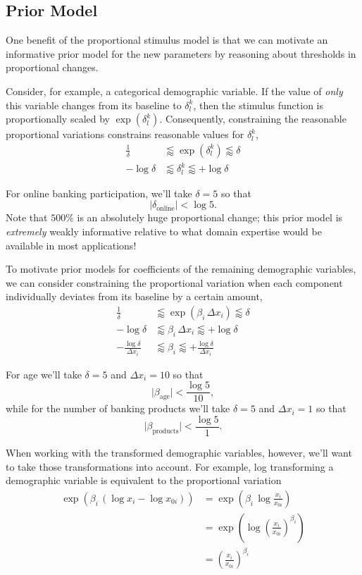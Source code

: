 \documentclass[
  letterpaper,
  DIV=11,
  numbers=noendperiod]{scrartcl}
\begin{document}
\subsection{Prior Model}\label{prior-model-2}

One benefit of the proportional stimulus model is that we can motivate
an informative prior model for the new parameters by reasoning about
thresholds in proportional changes.

Consider, for example, a categorical demographic variable. If the value
of \emph{only} this variable changes from its baseline to
\(\delta^{k}_{l}\), then the stimulus function is proportionally scaled
by \(\exp( \delta^{k}_{l} )\). Consequently, constraining the reasonable
proportional variations constrains reasonable values for
\(\delta^{k}_{l}\), \begin{align*}
\frac{1}{\delta} &\lessapprox
\exp( \delta^{k}_{l} ) \lessapprox
\delta
\\
- \log \delta &\lessapprox
\delta^{k}_{l} \lessapprox
+ \log \delta
\end{align*}

For online banking participation, we'll take \(\delta = 5\) so that \[
\vert \delta_{\mathrm{online}} \vert < \log 5.
\] Note that \(500\%\) is an absolutely huge proportional change; this
prior model is \emph{extremely} weakly informative relative to what
domain expertise would be available in most applications!

To motivate prior models for coefficients of the remaining demographic
variables, we can consider constraining the proportional variation when
each component individually deviates from its baseline by a certain
amount, \begin{align*}
\frac{1}{\delta} &\lessapprox
\exp( \beta_{i} \, \Delta x_{i} ) \lessapprox
\delta
\\
- \log \delta &\lessapprox
\beta_{i} \, \Delta x_{i} \lessapprox
+ \log \delta
\\
- \frac{ \log \delta}{ \Delta x_{i} } &\lessapprox
\beta_{i} \lessapprox
+ \frac{ \log \delta }{ \Delta x_{i} }
\end{align*}

For age we'll take \(\delta = 5\) and \(\Delta x_{i} = 10\) so that \[
\vert \beta_{\mathrm{age}} \vert < \frac{ \log 5 }{ 10 },
\] while for the number of banking products we'll take \(\delta = 5\)
and \(\Delta x_{i} = 1\) so that \[
\vert \beta_{\mathrm{products}} \vert < \frac{ \log 5 }{ 1 }.
\]

When working with the transformed demographic variables, however, we'll
want to take those transformations into account. For example, log
transforming a demographic variable is equivalent to the proportional
variation \begin{align*}
\exp \left( \beta_{i} \, (\log x_{i} - \log x_{0i}) \right)
&=
\exp \left( \beta_{i} \, \log \frac{ x_{i} }{ x_{0i} } \right)
\\
&=
\exp \left(
  \log \left( \frac{ x_{i} }{ x_{0i} } \right)^{\beta_{i}}
\right)
\\
&=
\left( \frac{ x_{i} }{ x_{0i} } \right)^{\beta_{i}}
\end{align*}
\end{document}

